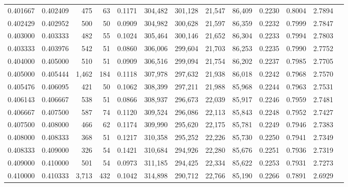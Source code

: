 \begin{tabular}{rrrrrrrrrrrrr}
0.401667 & 0.402409 &   475 &  63 &                                     0.1171 & 304,482 & 301,128 &  21,547 &  86,409 & 0.2230 & 0.8004 & 2.7894 \\
0.402429 & 0.402952 &   500 &  50 &                                     0.0909 & 304,982 & 300,628 &  21,597 &  86,359 & 0.2232 & 0.7999 & 2.7847 \\
0.403000 & 0.403333 &   482 &  55 &                                     0.1024 & 305,464 & 300,146 &  21,652 &  86,304 & 0.2233 & 0.7994 & 2.7803 \\
0.403333 & 0.403976 &   542 &  51 &                                     0.0860 & 306,006 & 299,604 &  21,703 &  86,253 & 0.2235 & 0.7990 & 2.7752 \\
0.404000 & 0.405000 &   510 &  51 &                                     0.0909 & 306,516 & 299,094 &  21,754 &  86,202 & 0.2237 & 0.7985 & 2.7705 \\
0.405000 & 0.405444 & 1,462 & 184 &                                     0.1118 & 307,978 & 297,632 &  21,938 &  86,018 & 0.2242 & 0.7968 & 2.7570 \\
0.405476 & 0.406095 &   421 &  50 &                                     0.1062 & 308,399 & 297,211 &  21,988 &  85,968 & 0.2244 & 0.7963 & 2.7531 \\
0.406143 & 0.406667 &   538 &  51 &                                     0.0866 & 308,937 & 296,673 &  22,039 &  85,917 & 0.2246 & 0.7959 & 2.7481 \\
0.406667 & 0.407500 &   587 &  74 &                                     0.1120 & 309,524 & 296,086 &  22,113 &  85,843 & 0.2248 & 0.7952 & 2.7427 \\
0.407500 & 0.408000 &   466 &  62 &                                     0.1174 & 309,990 & 295,620 &  22,175 &  85,781 & 0.2249 & 0.7946 & 2.7383 \\
0.408000 & 0.408333 &   368 &  51 &                                     0.1217 & 310,358 & 295,252 &  22,226 &  85,730 & 0.2250 & 0.7941 & 2.7349 \\
0.408333 & 0.409000 &   326 &  54 &                                     0.1421 & 310,684 & 294,926 &  22,280 &  85,676 & 0.2251 & 0.7936 & 2.7319 \\
0.409000 & 0.410000 &   501 &  54 &                                     0.0973 & 311,185 & 294,425 &  22,334 &  85,622 & 0.2253 & 0.7931 & 2.7273 \\
0.410000 & 0.410333 & 3,713 & 432 &                                     0.1042 & 314,898 & 290,712 &  22,766 &  85,190 & 0.2266 & 0.7891 & 2.6929 \\

\end{tabular}
